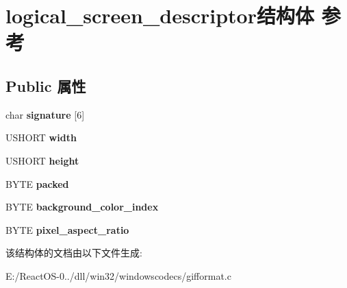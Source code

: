 \hypertarget{structlogical__screen__descriptor}{}\section{logical\+\_\+screen\+\_\+descriptor结构体 参考}
\label{structlogical__screen__descriptor}
\subsection*{Public 属性}
\begin{DoxyCompactItemize}
\item 
\mbox{\label{structlogical__screen__descriptor_aa44e5e21670ae9d845552d5275cebd13}} 
char {\bfseries signature} \mbox{[}6\mbox{]}
\item 
\mbox{\label{structlogical__screen__descriptor_a071823e254cb21a97deea9555bd4488f}} 
U\+S\+H\+O\+RT {\bfseries width}
\item 
\mbox{\label{structlogical__screen__descriptor_a0c62d53adb3f47df610e8a6ab35c41f0}} 
U\+S\+H\+O\+RT {\bfseries height}
\item 
\mbox{\label{structlogical__screen__descriptor_a0263f111fb34380691e7466777d4f2c0}} 
B\+Y\+TE {\bfseries packed}
\item 
\mbox{\label{structlogical__screen__descriptor_a4bc5a7c6d0603d948c619a773bdad6de}} 
B\+Y\+TE {\bfseries background\+\_\+color\+\_\+index}
\item 
\mbox{\label{structlogical__screen__descriptor_ae061d119150e8e2af8a2ce0ee40dcb72}} 
B\+Y\+TE {\bfseries pixel\+\_\+aspect\+\_\+ratio}
\end{DoxyCompactItemize}


该结构体的文档由以下文件生成\+:\begin{DoxyCompactItemize}
\item 
E\+:/\+React\+O\+S-\/0../dll/win32/windowscodecs/gifformat.\+c\end{DoxyCompactItemize}
